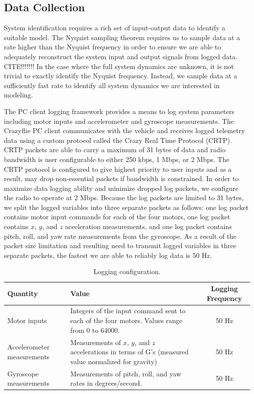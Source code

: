 \subsection{Data Collection}
System identification requires a rich set of input-output data to identify a suitable model. The Nyquist sampling theorem requires us to sample data at a rate higher than the Nyquist frequency in order to ensure we are able to adequately reconstruct the system input and output signals from logged data. CITE!!!!!!! In the case where the full system dynamics are unknown, it is not trivial to exactly identify the Nyquist frequency. Instead, we sample data at a sufficiently fast rate to identify all system dynamics we are interested in modeling. 

The PC client logging framework provides a means to log system parameters including motor inputs and accelerometer and gyroscope measurements. The Crazyflie PC client communicates with the vehicle and receives logged telemetry data using a custom protocol called the Crazy Real Time Protocol (CRTP). CRTP packets are able to carry a maximum of 31 bytes of data and radio bandwidth is user configurable to either 250 kbps, 1 Mbps, or 2 Mbps. The CRTP protocol is configured to give highest priority to user inputs and as a result, may drop non-essential packets if bandwidth is constrained. In order to maximize data logging ability and minimize dropped log packets, we configure the radio to operate at 2 Mbps. Because the log packets are limited to 31 bytes, we split the logged variables into three separate packets as follows: one log packet contains motor input commands for each of the four motors, one log packet contains $x$, $y$, and $z$ acceleration measurements, and one log packet contains pitch, roll, and yaw rate measurements from the gyroscope. As a result of the packet size limitation and resulting need to transmit logged variables in three separate packets, the fastest we are able to reliably log data is 50 Hz.
\begin{table}[!htb]
\centering
\caption{Logging configuration.}\vspace{1em}
\begin{tabular}{p{7em}p{17em}c}
\toprule
Quantity & Value & Logging Frequency\\
\midrule
Motor inputs & Integers of the input command sent to each of the four motors. Values range from 0 to 64000. & 50 Hz \\[5em]
Accelerometer measurements & Measurements of $x$, $y$, and $z$ accelerations in terms of G's (measured value normalized for gravity) & 50 Hz\\[3em]
Gyroscope \hspace{2em}measurements & Measurements of pitch, roll, and yaw rates in degrees/second. & 50 Hz\\
\bottomrule
\end{tabular}
\end{table}


